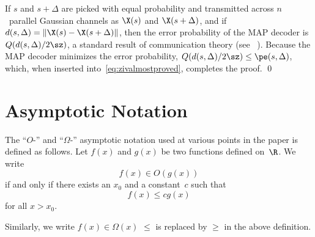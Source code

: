 \begin{subappendices}
  If $s$ and $s+\Delta$ are picked with equal probability and transmitted across
  $n$~parallel Gaussian channels as $\X(s)$ and $\X(s+\Delta)$, and if $d(s,
  \Delta) = \| \X(s) - \X(s + \Delta)\|$, then the error probability of the MAP
  decoder is $Q(d(s,\Delta) / 2 \sz)$, a standard result of communication theory
  (see \eg~\cite[Section~4.5]{WozencraftJ1965}). Because the MAP decoder minimizes
  the error probability, $Q(d(s,\Delta)/2\sz) \le \pe(s,\Delta)$, which, when
  inserted into~\eqref{eq:zivalmostproved}, completes the proof. \hfill\qed


  \section{Asymptotic Notation}
  \label{app:Onotation}
  The ``$O$-'' and ``$\Omega$-'' asymptotic notation used at various points in
  the paper is defined as follows.  Let $f(x)$ and $g(x)$ be two functions
  defined on~$\R$.  We write
  \begin{equation*}
    f(x) \in O(g(x))
  \end{equation*}
  if and only if there exists an $x_0$ and a constant~$c$ such that
  \begin{equation*}
    f(x) \le c g(x)
  \end{equation*}
  for all $x > x_0$. 

  Similarly, we write $f(x) \in \Omega(x)$ $\le$ is replaced by $\ge$ in the
  above definition.

\end{subappendices}

